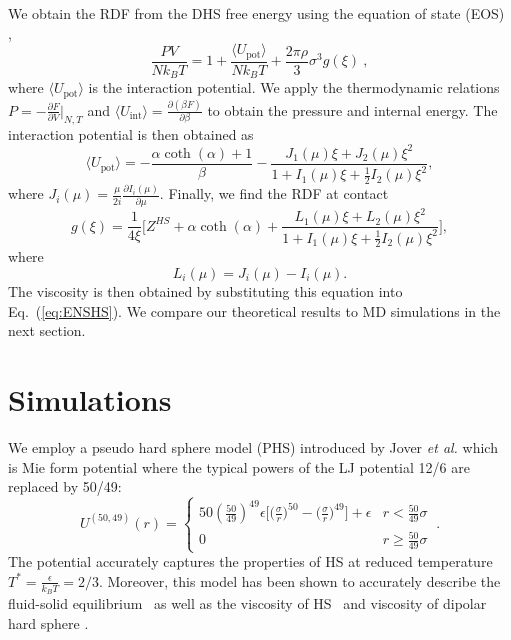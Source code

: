 \documentclass[preprint,pre,aps,superscriptaddress,a4paper]{revtex4}
\begin{document}
We obtain the RDF from the DHS free energy using the equation of state (EOS) \cite{Lee:89:0,Pippo:77:00},
\begin{equation}
\frac{PV}{Nk_BT} =1+ \frac{\langle U_\mathrm{pot} \rangle }{Nk_BT} + \frac{2\pi \rho}{3} \sigma^3 g(\xi)~,%
\label{kusalik}
\end{equation}
where  $\langle U_\mathrm{pot} \rangle$ is the interaction potential.
We apply the  thermodynamic relations
$P=-\frac{\partial  F}{\partial V} \vert_{N,T}$ 
and
$\langle  U_\mathrm{int}\rangle=\frac{\partial (\beta F)}{\partial\beta}$
to obtain the pressure and internal energy. The interaction potential is then obtained as
\begin{equation}
\langle  U_\mathrm{pot}\rangle=-\frac{\alpha \coth(\alpha)+1}{\beta}-\frac{J_1(\mu)\xi+J_2(\mu)\xi^2}{1+I_1(\mu)\xi+\frac{1}{2}I_2(\mu)\xi^2}  ,
\end{equation}
where $J_i(\mu)= \frac{\mu}{2i}\frac{\partial I_i(\mu) }{\partial\mu} $.
Finally, we find the RDF at contact
\begin{equation}
g(\xi) =\frac{1}{4 \xi} \bigg[Z^{HS}+\alpha \coth(\alpha) +\frac{L_1(\mu)\xi+L_2(\mu)\xi^2}{1+I_1(\mu)\xi+\frac{1}{2}I_2(\mu)\xi^2}   \bigg] ,
\label{eq:g}
\end{equation}
where 
\begin{equation}
L_i(\mu)= J_i(\mu) - I_i(\mu).
\end{equation}
The viscosity is then obtained by substituting this equation into Eq.~(\ref{eq:ENSHS}).
We compare our  theoretical results to MD simulations in the next section.
\section{Simulations}
We  employ a pseudo hard sphere model (PHS) introduced by Jover {\it {et al.}}\cite{jover:12:0} which is  Mie form potential  where the typical powers of the LJ potential 12/6 are replaced by 50/49:
\begin{equation}
U^{(50,49)}(r)=
  \begin{cases} 
    50 (\frac{50}{49})^{49}
    \epsilon \big[ \big(\frac{\sigma}{r}\big)^{50 }-\big(\frac{\sigma}{r}\big)^{49 }  \big]+\epsilon & r<   \frac{50}{49} \sigma \\
   0 & r \geq   \frac{50}{49} \sigma
   \label{eqPHS}
  \end{cases}~.
\end{equation}
The potential accurately captures the properties of HS at reduced temperature $T^*= \frac{\epsilon}{k_B T} =2/3$. 
Moreover, this model has been shown to accurately describe the fluid-solid equilibrium~\cite{vega:13:0} as well as the viscosity of HS~\cite{faezeh:19:00} and viscosity of dipolar hard sphere \cite{faezehastrid}. 
\end{document}
